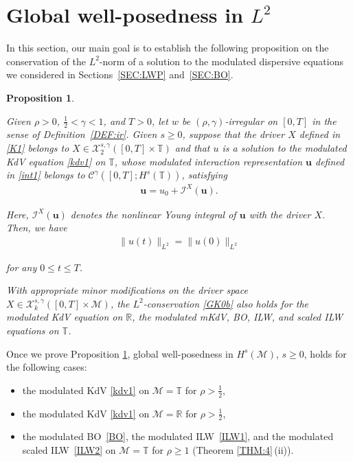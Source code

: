 \documentclass[letterpaper, 11pt,  reqno]{amsart}
\newtheorem{proposition}[theorem]{Proposition}
\newcommand{\1}{\hspace{0.5mm}\text{I}\hspace{0.5mm}}
\newcommand{\I}{\mathcal{I}}
\newcommand{\noi}{\noindent}
\newcommand{\R}{\mathbb{R}}
\newcommand{\T}{\mathbb{T}}
\newcommand{\CC}{\mathcal{C}}
\newcommand{\g}{\gamma}
\newcommand{\M}{\mathcal{M}}
\newcommand{\cX}{\mathcal{X}}
\newcommand{\uu}{\mathbf{u}}
\numberwithin{equation}{section}
\numberwithin{theorem}{section}
\begin{document}
\section{Global well-posedness in 
$L^2$}
\label{SEC:GWP1}

In this section, 
our main goal is to  establish the following proposition on the conservation of the $L^2$-norm
of a solution to the modulated dispersive equations
we considered in Sections~\ref{SEC:LWP} and~\ref{SEC:BO}.




\begin{proposition}
\label{PROP:L2}

Given $\rho > 0$,  $\frac 12 < \g < 1$, and $T> 0$, 
let  $w$ be $(\rho,\g)$-irregular on $[0, T]$ in the sense of Definition~\ref{DEF:ir}.
Given $s \ge 0$, suppose that 
the driver $X$  defined in 
\eqref{K1} belongs to 
   $X \in \cX^{s, \g}_2([0, T]\times \T)$
   and that 
$u $ is a solution to the modulated KdV equation \eqref{kdv1} on $\T$,  whose
modulated interaction representation $\uu$ defined in \eqref{int1}
belongs to  $\CC^\g([0, T];H^s(\T)) $, 
satisfying 
\begin{align}
\uu  = u_0 + \I^X(\uu).
\label{GK0a}
\end{align}


\noi
Here,  $\I^X(\uu)$ denotes the nonlinear Young integral of $\uu$
with the driver $X$.
Then, we have
\begin{align}
\| u(t) \|_{L^2} = \| u(0) \|_{L^2}
\label{GK0b}
\end{align}

\noi
for any $0 \le t \le T$.

With appropriate minor modifications
on the driver space 
   $X \in \cX^{s, \g}_k([0, T]\times \M)$, 
the  $L^2$-conservation \eqref{GK0b} also  holds
for the modulated KdV equation on $\R$, 
the modulated mKdV, BO, ILW, and scaled ILW equations on $\T$.


 
\end{proposition}

Once we prove 
 Proposition \ref{PROP:L2}, 
 global well-posedness in $H^s(\M)$, $s \ge 0$, 
holds
 for 
 the following cases:
 
  \smallskip
 \begin{itemize}
 \item[(i)]
 the modulated KdV \eqref{kdv1} on $\M = \T$
for   $\rho >  \frac 12$, 




 
 \smallskip
  \item[(ii)]
 the modulated KdV \eqref{kdv1} on $\M = \R$
for   $\rho >  \frac 12$, 



 \smallskip  
   \item[(iii)]
the modulated BO~\eqref{BO}, 
the modulated ILW~\eqref{ILW1}, 
and the modulated scaled ILW~\eqref{ILW2} on $\M = \T$
for  $\rho \ge 1 $
(Theorem \ref{THM:4}\,(ii)).


   
 
 \end{itemize}
 
\end{document}
